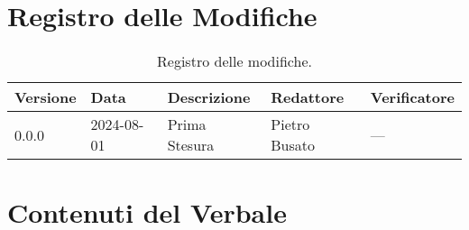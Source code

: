 \documentclass[8pt]{article}
\begin{document}
\section*{Registro delle Modifiche}
\begin{table}[ht!]	
	\centering
	\begin{tabular}{p{1.2cm} p{2cm} p{6cm} p{3cm} p{2cm}}
		\toprule
		\textbf{Versione}& \textbf{Data} & \textbf{Descrizione} & \textbf{Redattore} & \textbf{Verificatore} \\
		\midrule
		0.0.0 & 2024-08-01 & Prima Stesura  & Pietro Busato & --- \\
		\bottomrule
	\end{tabular}
	\caption{Registro delle modifiche.}
	\label{table:Registro delle modifiche}
\end{table}
\newpage
\tableofcontents
\clearpage
\newpage
\justifying
\section{Contenuti del Verbale}
\end{document}
